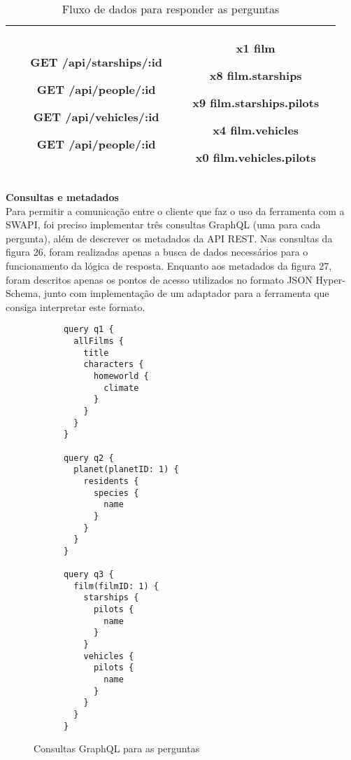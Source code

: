 \begin{table}[H]
\begin{tabular}{|c|c|c|}
\begin{minipage}[t]{0.3\textwidth}
\begin{itemize}
        \item[\textbf{GET}] /api/starships/:id
        \item[\textbf{GET}] /api/people/:id
        \item[\textbf{GET}] /api/vehicles/:id
        \item[\textbf{GET}] /api/people/:id
      \end{itemize}
    \end{minipage} & \begin{minipage}[t]{0.5\textwidth}
      \begin{itemize}
        \item[\textbf{x1}] film
        \item[\textbf{x8}] film.starships
        \item[\textbf{x9}] film.starships.pilots
        \item[\textbf{x4}] film.vehicles
        \item[\textbf{x0}] film.vehicles.pilots
      \end{itemize}
    \end{minipage} \\
    \hline
  \end{tabular}
  \caption{Fluxo de dados para responder as perguntas}
\end{table}

\textbf{Consultas e metadados} \\

Para permitir a comunicação entre o cliente que faz o uso da ferramenta com a SWAPI, foi preciso implementar três consultas GraphQL (uma para cada pergunta), além de descrever os metadados da API REST. Nas consultas da figura 26, foram realizadas apenas a busca de dados necessários para o funcionamento da lógica de resposta. Enquanto aos metadados da figura 27, foram descritos apenas os pontos de acesso utilizados no formato JSON Hyper-Schema, junto com implementação de um adaptador para a ferramenta que consiga interpretar este formato.

\begin{figure}[H]
  \centering
  \begin{verbatim}
      query q1 {
        allFilms {
          title
          characters {
            homeworld {
              climate
            }
          }
        }
      }
      
      query q2 {
        planet(planetID: 1) {
          residents {
            species {
              name
            }
          }
        }
      }
      
      query q3 {
        film(filmID: 1) {
          starships {
            pilots {
              name
            }
          }
          vehicles {
            pilots {
              name
            }
          }
        }
      }
  \end{verbatim}
  \caption{Consultas GraphQL para as perguntas}
\end{figure}

